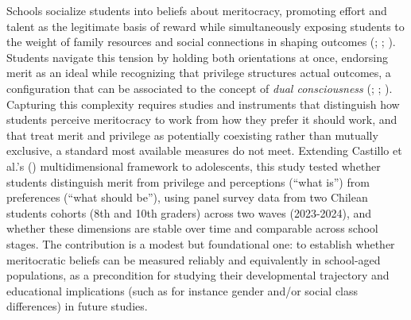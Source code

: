 \documentclass[
  13pt,
]{article}
\begin{document}
Schools socialize students into beliefs about meritocracy, promoting
effort and talent as the legitimate basis of reward while simultaneously
exposing students to the weight of family resources and social
connections in shaping outcomes
(;
;
). Students
navigate this tension by holding both orientations at once, endorsing
merit as an ideal while recognizing that privilege structures actual
outcomes, a configuration that can be associated to the concept of
\emph{dual consciousness} (; ;
). Capturing
this complexity requires studies and instruments that distinguish how
students perceive meritocracy to work from how they prefer it should
work, and that treat merit and privilege as potentially coexisting
rather than mutually exclusive, a standard most available measures do
not meet. Extending Castillo et al.'s
() multidimensional
framework to adolescents, this study tested whether students distinguish
merit from privilege and perceptions (``what is'') from preferences
(``what should be''), using panel survey data from two Chilean students
cohorts (8th and 10th graders) across two waves (2023-2024), and whether
these dimensions are stable over time and comparable across school
stages. The contribution is a modest but foundational one: to establish
whether meritocratic beliefs can be measured reliably and equivalently
in school-aged populations, as a precondition for studying their
developmental trajectory and educational implications (such as for
instance gender and/or social class differences) in future studies.
\end{document}
